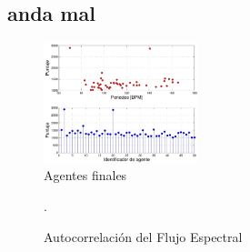 \documentclass[12pt,a4paper,titlepage]{report}
\begin{document}
\subsection{anda mal}

\begin{figure}
	\vspace{-25pt}
	\begin{center}
	\includegraphics[width=0.4\textwidth]{./pics/train11_agents.pdf}
	\end{center}
	\vspace{-20pt}
	\caption{Agentes finales}
	\label{fig:train11_agents}
	\vspace{-35pt}
\end{figure}

\begin{figure} [h!]
\centering
  \caption{Autocorrelación del Flujo Espectral}
  \label{fig:train11_autocorrelaciones}.
\end{figure}
\end{document}
